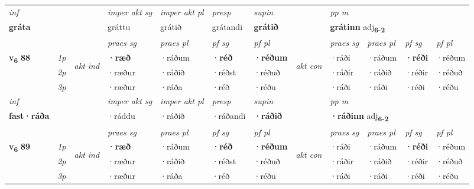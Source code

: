 \begin{longtable}[l]{X>{\footnotesize\itshape}llXXXXlXXXX}
   {\textit{inf}} & &  & \textit{imper akt sg} & \textit{imper akt pl}   & \textit{presp} & \textit{supin}  && \textit{pp m} \\*
  {\textbf{gráta}} & && gráttu  & grátið   & grátandi &  \textbf{grátið}  && \multicolumn{2}{l}{\textbf{grátinn} adj\textbf{\textsubscript{6-2}}} \\*

\midrule

 & &   & \textit{praes sg}  & \textit{praes pl}    & \textit{ pf sg} & \textit{pf pl} & & \textit{praes sg}  & \textit{praes pl}    & \textit{pf sg} & \textit{pf pl }  \\ \cmidrule{4-7} \cmidrule{9-12}
 \multirow{2}{*}{{{\textbf{v{\textsubscript{6}}} \Large{\textbf{88}}}}}  & 1p & \multirow{3}{*}{\begin{turn}{90}\textit{akt ind}\end{turn}} & \textbf{·ræð} & ·ráðum & \textbf{·réð} & \textbf{·réðum} & \multirow{3}{*}{\begin{turn}{90}\textit{akt con}\end{turn}} &·ráði & ·ráðum & \textbf{·réði} & ·réðum\\*
 & 2p &  &  ·ræður  & ·ráðið & ·réðst & ·réðuð & & ·ráðir & ·ráðið & ·réðir & ·réðuð \\*
 & 3p &  & ·ræður & ·ráða & ·réð & ·réðu & & ·ráði & ·ráði& ·réði & ·réðu \\*
\cmidrule{4-7} \cmidrule{9-12}

   {\textit{inf}} & &  & \textit{imper akt sg} & \textit{imper akt pl}   & \textit{presp} & \textit{supin}  && \textit{pp m} \\*
  {\textbf{fast\allowbreak ·ráða}} & && ·ráddu  & ·ráðið   & ·ráðandi &  \textbf{·ráðið}  && \multicolumn{2}{l}{\textbf{·ráðinn} adj\textbf{\textsubscript{6-2}}} \\*

\midrule

 & &   & \textit{praes sg}  & \textit{praes pl}    & \textit{ pf sg} & \textit{pf pl} & & \textit{praes sg}  & \textit{praes pl}    & \textit{pf sg} & \textit{pf pl }  \\ \cmidrule{4-7} \cmidrule{9-12}
 \multirow{2}{*}{{{\textbf{v{\textsubscript{6}}} \Large{\textbf{89}}}}}  & 1p & \multirow{3}{*}{\begin{turn}{90}\textit{akt ind}\end{turn}} & \textbf{·ræð} & ·ráðum & \textbf{·réð} & \textbf{·réðum} & \multirow{3}{*}{\begin{turn}{90}\textit{akt con}\end{turn}} &·ráði & ·ráðum & \textbf{·réði} & ·réðum\\*
 & 2p &  &  ·ræður  & ·ráðið & ·réðst & ·réðuð & & ·ráðir & ·ráðið & ·réðir & ·réðuð \\*
 & 3p &  & ·ræður & ·ráða & ·réð & ·réðu & & ·ráði & ·ráði& ·réði & ·réðu \\*
\cmidrule{4-7} \cmidrule{9-12}


\end{longtable}
